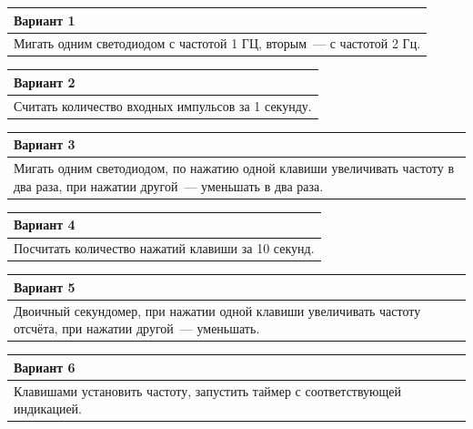 \documentclass[main.tex]{subfiles}
\begin{document}
\begin{small}
\vspace{12px}
\noindent
\begin{tabularx}{\textwidth}{|X|}
\hline
\textbf{Вариант 1}\\
\hline
Мигать одним светодиодом с частотой 1 ГЦ, вторым~--- с частотой 2 Гц.\\
\hline
\end{tabularx}

\vspace{12px}
\noindent
\begin{tabularx}{\textwidth}{|X|}
\hline
\textbf{Вариант 2}\\
\hline
Считать количество входных импульсов за 1 секунду.\\
\hline
\end{tabularx}

\vspace{12px}
\noindent
\begin{tabularx}{\textwidth}{|X|}
\hline
\textbf{Вариант 3}\\
\hline
Мигать одним светодиодом, по нажатию одной клавиши увеличивать частоту в два раза, при нажатии другой~--- уменьшать в два раза.\\
\hline
\end{tabularx}

\vspace{12px}
\noindent
\begin{tabularx}{\textwidth}{|X|}
\hline
\textbf{Вариант 4}\\
\hline
Посчитать количество нажатий клавиши за 10 секунд.\\
\hline
\end{tabularx}

\vspace{12px}
\noindent
\begin{tabularx}{\textwidth}{|X|}
\hline
\textbf{Вариант 5}\\
\hline
Двоичный секундомер, при нажатии одной клавиши увеличивать частоту отсчёта, при нажатии другой~--- уменьшать.\\
\hline
\end{tabularx}

\vspace{12px}
\noindent
\begin{tabularx}{\textwidth}{|X|}
\hline
\textbf{Вариант 6}\\
\hline
Клавишами установить частоту, запустить таймер с соответствующей индикацией.\\
\hline
\end{tabularx}


\end{small}
\end{document}

